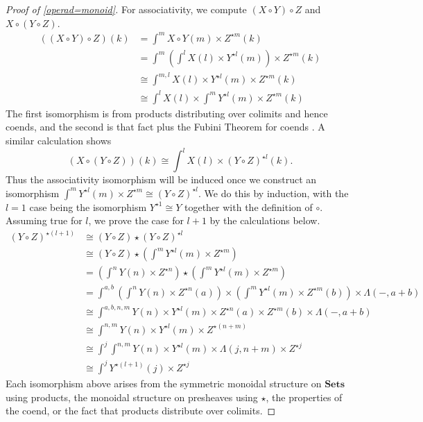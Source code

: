 \documentclass{amsbook} %
\newcommand{\mb}{\mathbf}
\numberwithin{section}{chapter}
\begin{document}
\begin{proof}[Proof of \ref{operad=monoid}]
For associativity, we compute $(X \circ Y) \circ Z$ and $X \circ (Y \circ Z)$.
  \begin{align*}
    ((X \circ Y) \circ Z) (k) &= \int^{m} X \circ Y (m) \times Z^{\star m}(k) \\
    &= \int^{m} \left( \int^{l} X(l) \times Y^{\star l}(m) \right) \times Z^{\star m}(k) \\
    &\cong \int^{m,l} X(l) \times Y^{\star l}(m) \times Z^{\star m}(k) \\
    &\cong \int^{l} X(l) \times \int^{m} Y^{\star l}(m) \times Z^{\star m}(k)
  \end{align*}
The first isomorphism is from products distributing over colimits and hence coends, and the second is that fact plus the Fubini Theorem for coends \cite{maclane-catwork}.  A similar calculation shows
  \[
    (X \circ (Y \circ Z))(k) \cong \int^{l} X(l) \times (Y \circ Z)^{\star l}(k).
  \]
Thus the associativity isomorphism will be induced once we construct an isomorphism $\int^{m} Y^{\star l}(m) \times Z^{\star m} \cong (Y \circ Z)^{\star l}$.  We do this by induction, with the $l=1$ case being the isomorphism $Y^{\star 1} \cong Y$ together with the definition of $\circ.$  Assuming true for $l$, we prove the case for $l+1$ by the calculations below.
  \begin{align*}
    (Y \circ Z)^{\star (l+1)} &\cong (Y \circ Z) \star (Y \circ Z)^{\star l} \\
    &\cong (Y \circ Z) \star \left( \int^{m} Y^{\star l}(m) \times Z^{\star m} \right) \\
    &= \left( \int^{n} Y(n) \times Z^{\star n} \right) \star \left( \int^{m} Y^{\star l}(m) \times Z^{\star m} \right) \\
    &= \int^{a,b} \left( \int^{n} Y(n) \times Z^{\star n}(a) \right)  \times \left( \int^{m} Y^{\star l}(m) \times Z^{\star m}(b) \right) \times \mathbb{\Lambda}(-, a+b) \\
    &\cong \int^{a,b,n,m} Y(n) \times Y^{\star l}(m) \times Z^{\star n}(a) \times Z^{\star m}(b) \times  \mathbb{\Lambda}(-, a+b) \\
    &\cong \int^{n,m} Y(n) \times Y^{\star l}(m) \times Z^{\star (n+m)} \\
    &\cong \int^{j} \int^{n,m} Y(n) \times Y^{\star l}(m) \times \mathbb{\Lambda}(j, n+m) \times Z^{\star j} \\
    &\cong \int^{j} Y^{\star (l+1)}(j) \times Z^{\star j}
  \end{align*}
Each isomorphism above arises from the symmetric monoidal structure on $\mb{Sets}$ using products, the monoidal structure on presheaves using $\star$, the properties of the coend, or the fact that products distribute over colimits.


\end{proof}
\end{document}
